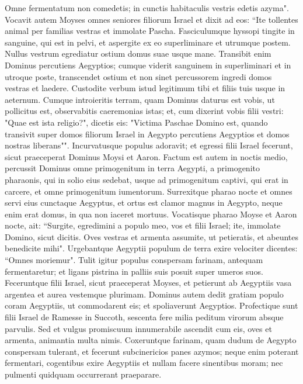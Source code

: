 \begin{biblechapter}
\verse Omne fermentatum non comedetis; in cunctis habitaculis vestris edetis azyma". 
\verse Vocavit autem Moyses omnes seniores filiorum Israel et dixit ad eos: “Ite tollentes animal per familias vestras et immolate Pascha. 
\verse Fasciculumque hyssopi tingite in sanguine, qui est in pelvi, et aspergite ex eo superliminare et utrumque postem. Nullus vestrum egrediatur ostium domus suae usque mane.  
\verse Transibit enim Dominus percutiens Aegyptios; cumque viderit sanguinem in superliminari et in utroque poste, transcendet ostium et non sinet percussorem ingredi domos vestras et laedere. 
\verse Custodite verbum istud legitimum tibi et filiis tuis usque in aeternum. 
\verse Cumque introieritis terram, quam Dominus daturus est vobis, ut pollicitus est, observabitis caeremonias istas;  
\verse et, cum dixerint vobis filii vestri: "Quae est ista religio?", 
\verse dicetis eis: "Victima Paschae Domino est, quando transivit super domos filiorum Israel in Aegypto percutiens Aegyptios et domos nostras liberans"". Incurvatusque populus adoravit; 
\verse et egressi filii Israel fecerunt, sicut praeceperat Dominus Moysi et Aaron. 
\verse Factum est autem in noctis medio, percussit Dominus omne primogenitum in terra Aegypti, a primogenito pharaonis, qui in solio eius sedebat, usque ad primogenitum captivi, qui erat in carcere, et omne primogenitum iumentorum.  
\verse Surrexitque pharao nocte et omnes servi eius cunctaque Aegyptus, et ortus est clamor magnus in Aegypto, neque enim erat domus, in qua non iaceret mortuus.  
\verse Vocatisque pharao Moyse et Aaron nocte, ait: “Surgite, egredimini a populo meo, vos et filii Israel; ite, immolate Domino, sicut dicitis. 
\verse Oves vestras et armenta assumite, ut petieratis, et abeuntes benedicite mihi".  
\verse Urgebantque Aegyptii populum de terra exire velociter dicentes: “Omnes moriemur". 
\verse Tulit igitur populus conspersam farinam, antequam fermentaretur; et ligans pistrina in palliis suis posuit super umeros suos.  
\verse Feceruntque filii Israel, sicut praeceperat Moyses, et petierunt ab Aegyptiis vasa argentea et aurea vestemque plurimam. 
\verse Dominus autem dedit gratiam populo coram Aegyptiis, ut commodarent eis; et spoliaverunt Aegyptios. 
\verse Profectique sunt filii Israel de Ramesse in Succoth, sescenta fere milia peditum virorum absque parvulis. 
\verse Sed et vulgus promiscuum innumerabile ascendit cum eis, oves et armenta, animantia multa nimis. 
\verse Coxeruntque farinam, quam dudum de Aegypto conspersam tulerant, et fecerunt subcinericios panes azymos; neque enim poterant fermentari, cogentibus exire Aegyptiis et nullam facere sinentibus moram; nec pulmenti quidquam occurrerant praeparare. 

\end{biblechapter}
